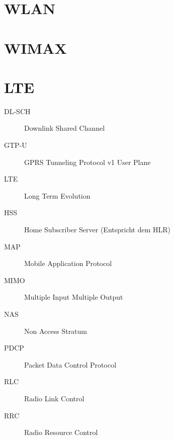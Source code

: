 \documentclass[10pt,a4paper]{scrartcl}
\begin{document}
\section{WLAN}


\section{WIMAX}


\section{LTE}

\begin{description}
	\item[DL-SCH] Downlink Shared Channel
	\item[GTP-U] GPRS Tunneling Protocol v1 User Plane
	\item[LTE] Long Term Evolution
	\item[HSS] Home Subscriber Server (Entspricht dem HLR)
	\item[MAP] Mobile Application Protocol
	\item[MIMO] Multiple Input Multiple Output
	\item[NAS] Non Access Stratum
	\item[PDCP] Packet Data Control Protocol
	\item[RLC] Radio Link Control
	\item[RRC] Radio Resource Control
\end{description}
\end{document}
